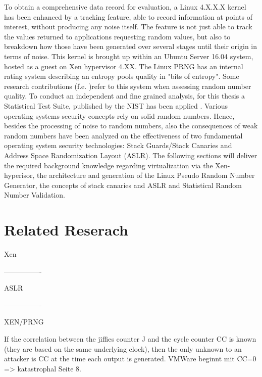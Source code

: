 To obtain a comprehensive data record for evaluation, a Linux 4.X.X.X kernel has been enhanced by a tracking feature, able to record information at points of interest, without producing any noise itself. The feature is not just able to track the values returned to applications requesting random values, but also to breakdown how those have been generated over several stages until their origin in terms of noise. This kernel is brought up within an Ubuntu Server 16.04 system, hosted as a guest on Xen hypervisor 4.XX. The Linux PRNG has an internal rating system describing an entropy pools quality in "bits of entropy". Some research contributions (f.e. \cite{lacharme2012linux})refer to this system when assessing random number quality. To conduct an independent and fine grained analysis, for this thesis a Statistical Test Suite, published by the NIST has been applied \cite{paul2016nist}. Various operating systems security concepts rely on solid random numbers. Hence, besides the processing of noise to random numbers, also the consequences of weak random numbers have been analyzed on the effectiveness of two fundamental operating system security technologies: Stack Guards/Stack Canaries and Address Space Randomization Layout (ASLR).
The following sections will deliver the required background knowledge regarding virtualization via the Xen-hyperisor, the architecture and generation of the Linux Pseudo Random Number Generator, the concepts of stack canaries and ASLR and Statistical Random Number Validation. 



\section{Related Reserach}

Xen

----------------

ASLR

----------------

XEN/PRNG

If the correlation between the jiffies counter J and the cycle counter CC is known (they are based on the same underlying clock), then the only unknown to an attacker is CC at the time each output is generated. \cite{everspaugh2014not} VMWare beginnt mit CC=0 => katastrophal \cite{everspaugh2014not} Seite 8.












   





